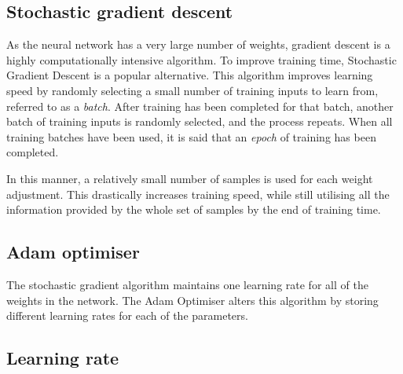 \subsection*{Stochastic gradient descent}\label{nnets-stochgraddesc}

As the neural network has a very large number of weights, gradient descent is a highly computationally intensive algorithm. To improve training time, Stochastic Gradient Descent is a popular alternative. This algorithm improves learning speed by randomly selecting a small number of training inputs to learn from, referred to as a \textit{batch}. After training has been completed for that batch, another batch of training inputs is randomly selected, and the process repeats. When all training batches have been used, it is said that an \textit{epoch} of training has been completed.

In this manner, a relatively small number of samples is used for each weight adjustment. This drastically increases training speed, while still utilising all the information provided by the whole set of samples by the end of training time.

\subsection*{Adam optimiser}\label{nnets-adam}

The stochastic gradient algorithm maintains one learning rate for all of the weights in the network. The Adam Optimiser alters this algorithm by storing different learning rates for each of the parameters. 

%
%
%

\subsection*{Learning rate}\label{nnets-learningrate}

